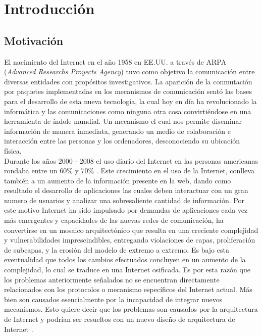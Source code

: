 \documentclass[12pt]{ociamthesis}  %
\begin{document}
\chapter{Introducción}
\section{Motivación}

El nacimiento del Internet en el año 1958 en EE.UU. a través de ARPA (\textit{Advanced Researchs Proyects Agency}) tuvo como objetivo la comunicación entre diversas entidades con propósitos investigativos. La aparición de la conmutación por paquetes implementadas en los mecanismos de comunicación sentó las bases para el desarrollo de esta nueva tecnología, la cual hoy en día ha revolucionado la informática y las comunicaciones como ninguna otra cosa convirtiéndose en una herramienta de índole mundial. Un mecanismo el cual nos permite diseminar información de manera inmediata, generando un medio de colaboración e interacción entre las personas y los ordenadores, desconociendo su ubicación física.\\

Durante los años 2000 - 2008 el uso diario del Internet en las personas americanas rondaba entre un 60\% y 70\% \cite{mossberger2007digital}. Este crecimiento en el uso de la Internet, conlleva también a un aumento de la información presente en la web, dando como resultado el desarrollo de aplicaciones las cuales deben interactuar con un gran numero de usuarios y analizar una sobresaliente cantidad de información. Por este motivo Internet ha sido impulsado por demandas de aplicaciones cada vez más emergentes y capacidades de las nuevas redes de comunicación, ha convertirse en un mosaico arquitectónico que resulta en una creciente complejidad y vulnerabilidades imprescindibles, entregando violaciones de capas, proliferación de subcapas, y la erosión del modelo de extremo a extremo. Es bajo esta eventualidad que todos los cambios efectuados concluyen en un aumento de la complejidad, lo cual se traduce en una Internet osificada. Es por esta razón que los problemas anteriormente señalados no se encuentran directamente relacionados con los protocolos o mecanismo específicos del Internet actual. Más bien son causados esencialmente por la incapacidad de integrar nuevos mecanismos. Esto quiere decir que los problemas son causados por la arquitectura de Internet y podrían ser resueltos con un nuevo diseño de arquitectura de Internet \cite{muller2009future}.\\
\end{document}
